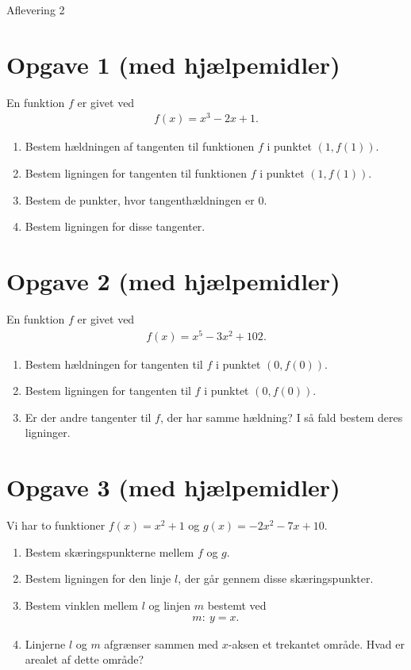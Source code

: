 
\begin{center}
\Huge
Aflevering 2
\end{center}
\section*{Opgave 1 \large (med hjælpemidler)}
En funktion $f$ er givet ved 
\begin{align*}
f(x) = x^3-2x+1.
\end{align*}
\begin{enumerate}[label=\roman*)]
\item Bestem hældningen af tangenten til funktionen $f$ i punktet $(1,f(1))$.
\item Bestem ligningen for tangenten til funktionen $f$ i punktet $(1,f(1))$.
\item Bestem de punkter, hvor tangenthældningen er $0$.
\item Bestem ligningen for disse tangenter.
\end{enumerate}

\section*{Opgave 2 \large (med hjælpemidler)}
En funktion $f$ er givet ved 
\begin{align*}
f(x) = x^5 -3x^2+102.
\end{align*}
\begin{enumerate}[label=\roman*)]
\item Bestem hældningen for tangenten til $f$ i punktet $(0,f(0))$. 
\item Bestem ligningen for tangenten til $f$ i punktet $(0,f(0))$. 
\item Er der andre tangenter til $f$, der har samme hældning? I så fald bestem deres ligninger. 
\end{enumerate}

\section*{Opgave 3 \large (med hjælpemidler)}
Vi har to funktioner $f(x) = x^2+1$ og $g(x) = -2x^2-7x+10$. 
\begin{enumerate}[label=\roman*)]
\item Bestem skæringspunkterne mellem $f$ og $g$. 
\item Bestem ligningen for den linje $l$, der går gennem disse skæringspunkter.
\item Bestem vinklen mellem $l$ og linjen $m$ bestemt ved
\begin{align*}
m: \ y = x.
\end{align*}
\item Linjerne $l$ og $m$ afgrænser sammen med $x$-aksen et trekantet område. Hvad er arealet af dette område?
\end{enumerate}
